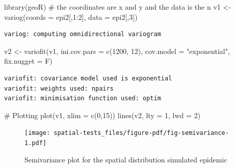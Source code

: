 \documentclass[
  letterpaper,
]{book}
\newenvironment{Shaded}{\begin{snugshade}}{\end{snugshade}}
\newcommand{\AttributeTok}[1]{\textcolor[rgb]{0.40,0.45,0.13}{#1}}
\newcommand{\CommentTok}[1]{\textcolor[rgb]{0.37,0.37,0.37}{#1}}
\newcommand{\DecValTok}[1]{\textcolor[rgb]{0.68,0.00,0.00}{#1}}
\newcommand{\FunctionTok}[1]{\textcolor[rgb]{0.28,0.35,0.67}{#1}}
\newcommand{\NormalTok}[1]{\textcolor[rgb]{0.00,0.23,0.31}{#1}}
\newcommand{\OtherTok}[1]{\textcolor[rgb]{0.00,0.23,0.31}{#1}}
\newcommand{\SpecialCharTok}[1]{\textcolor[rgb]{0.37,0.37,0.37}{#1}}
\newcommand{\StringTok}[1]{\textcolor[rgb]{0.13,0.47,0.30}{#1}}
\begin{document}
\begin{Shaded}
\begin{Highlighting}[]
\FunctionTok{library}\NormalTok{(geoR)}
\CommentTok{\# the coordinates are x and y and the data is the n}
\NormalTok{v1 }\OtherTok{\textless{}{-}} \FunctionTok{variog}\NormalTok{(}\AttributeTok{coords =}\NormalTok{ epi2[,}\DecValTok{1}\SpecialCharTok{:}\DecValTok{2}\NormalTok{], }\AttributeTok{data =}\NormalTok{ epi2[,}\DecValTok{3}\NormalTok{])}
\end{Highlighting}
\end{Shaded}

\begin{verbatim}
variog: computing omnidirectional variogram
\end{verbatim}

\begin{Shaded}
\begin{Highlighting}[]
\NormalTok{v2 }\OtherTok{\textless{}{-}} \FunctionTok{variofit}\NormalTok{(v1, }\AttributeTok{ini.cov.pars =} \FunctionTok{c}\NormalTok{(}\DecValTok{1200}\NormalTok{, }\DecValTok{12}\NormalTok{), }
               \AttributeTok{cov.model =} \StringTok{"exponential"}\NormalTok{, }
               \AttributeTok{fix.nugget =}\NormalTok{ F)}
\end{Highlighting}
\end{Shaded}

\begin{verbatim}
variofit: covariance model used is exponential 
variofit: weights used: npairs 
variofit: minimisation function used: optim 
\end{verbatim}

\begin{Shaded}
\begin{Highlighting}[]
\CommentTok{\# Plotting }
\FunctionTok{plot}\NormalTok{(v1, }\AttributeTok{xlim =} \FunctionTok{c}\NormalTok{(}\DecValTok{0}\NormalTok{,}\DecValTok{15}\NormalTok{))}
\FunctionTok{lines}\NormalTok{(v2, }\AttributeTok{lty =} \DecValTok{1}\NormalTok{, }\AttributeTok{lwd =} \DecValTok{2}\NormalTok{)}
\end{Highlighting}
\end{Shaded}

\begin{figure}[H]

{\centering \texttt{[image: spatial-tests\_files/figure-pdf/fig-semivariance-1.pdf]}

}

\caption{\label{fig-semivariance}Semivariance plot for the spatial
distribution simulated epidemic}

\end{figure}
\end{document}
